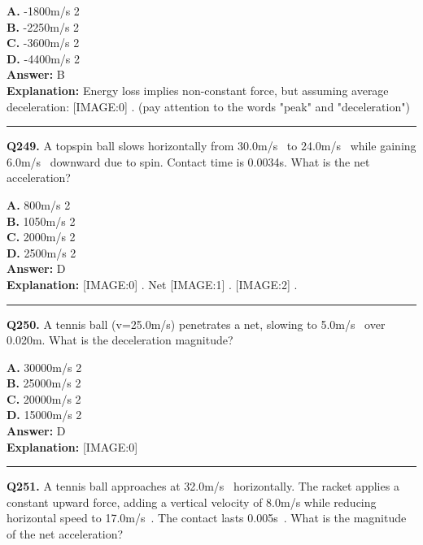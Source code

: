 \documentclass[12pt]{article}
\begin{document}
\textbf{A.} -1800m/s
2 \\
\textbf{B.} -2250m/s
2 \\
\textbf{C.} -3600m/s
2 \\
\textbf{D.} -4400m/s
2 \\

\textbf{Answer:} B \\
\textbf{Explanation:} Energy loss implies non-constant force, but assuming average deceleration:
[IMAGE:0]
.
(pay attention to the words "peak" and "deceleration")

\hrule
\vspace{1em}


\noindent
\textbf{Q249.} A topspin ball slows horizontally from 30.0m/s  to 24.0m/s  while gaining 6.0m/s  downward due to spin. Contact time is 0.0034s.
What is the net acceleration?



\textbf{A.} 800m/s
2 \\
\textbf{B.} 1050m/s
2 \\
\textbf{C.} 2000m/s
2 \\
\textbf{D.} 2500m/s
2 \\

\textbf{Answer:} D \\
\textbf{Explanation:} [IMAGE:0]
. Net
[IMAGE:1]
.
[IMAGE:2]
.

\hrule
\vspace{1em}


\noindent
\textbf{Q250.} A tennis ball (v=25.0m/s) penetrates a net, slowing to 5.0m/s  over 0.020m.
What is the deceleration magnitude?



\textbf{A.} 30000m/s
2 \\
\textbf{B.} 25000m/s
2 \\
\textbf{C.} 20000m/s
2 \\
\textbf{D.} 15000m/s
2 \\

\textbf{Answer:} D \\
\textbf{Explanation:} [IMAGE:0]

\hrule
\vspace{1em}


\noindent
\textbf{Q251.} A tennis ball approaches at 32.0m/s  horizontally. The racket applies a constant upward force, adding a vertical velocity of 8.0m/s while reducing horizontal speed to 17.0m/s . The contact lasts 0.005s .
What is the magnitude of the net acceleration?
\end{document}

